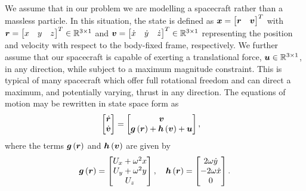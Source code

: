 \documentclass[]{aiaa-tc}%
\begin{document}
We assume that in our problem we are modelling a spacecraft rather than a massless particle.
In this situation, the state is defined as \( \bm{x} = \begin{bmatrix}\bm{r} &\bm{v} \end{bmatrix}^T\) with \(\bm{r} = \begin{bmatrix} x & y & z \end{bmatrix}^T \in \mathbb{R}^{3\times1}\) and \(\bm{v}= \begin{bmatrix} \dot{x} & \dot{y} & \dot{z} \end{bmatrix}^T \in \mathbb{R}^{3\times1}\) representing the position and velocity with respect to the body-fixed frame, respectively.
We further assume that our spacecraft is capable of exerting a translational force, \( \bm{u} \in \mathbb{R}^{3\times1} \), in any direction, while subject to a maximum magnitude constraint.
This is typical of many spacecraft which offer full rotational freedom and can direct a maximum, and potentially varying, thrust in any direction.
The equations of motion may be rewritten in state space form as
\begin{align}\label{eq:state_space_eoms}
    \begin{bmatrix} \dot{\bm{r}} \\ \dot{\bm{v}} \end{bmatrix} &=
    \begin{bmatrix}\bm{v} \\ \bm{g} \left( \bm{r} \right) + \bm{h}\left( \bm{v} \right) + \bm{u} \end{bmatrix} ,
\end{align}
where the terms \(\bm{g} \left( \bm{r} \right) \) and \( \bm{h}\left( \bm{v} \right) \) are given by
\begin{align}\label{eq:state_space_terms}
    \bm{g}\left( \bm{r} \right) = \begin{bmatrix}  U_x + \omega^2 x \\ U_y + \omega^2 y \\ U_z \end{bmatrix} ,\quad
    \bm{h}\left( \bm{r} \right) = \begin{bmatrix} 2 \omega \dot{y} \\ -2 \omega \dot{x} \\ 0 \end{bmatrix} .
\end{align}
\end{document}
